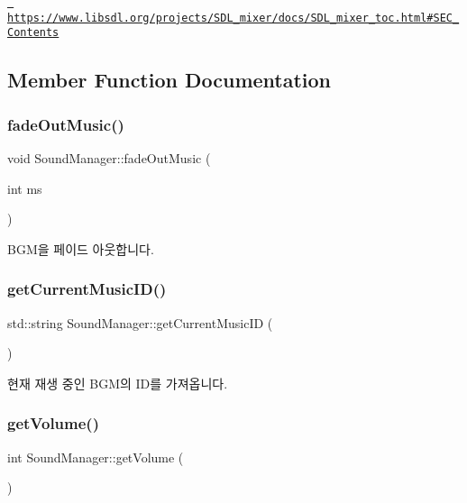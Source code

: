 \href{https://www.libsdl.org/projects/SDL_mixer/docs/SDL_mixer_toc.html\#SEC_Contents}{\texttt{ https\+://www.\+libsdl.\+org/projects/\+S\+D\+L\+\_\+mixer/docs/\+S\+D\+L\+\_\+mixer\+\_\+toc.\+html\#\+S\+E\+C\+\_\+\+Contents}} 

\subsection{Member Function Documentation}
\mbox{\label{class_sound_manager_aea6a94c8b5456812c49115baa7534bf7}} 
\subsubsection{\texorpdfstring{fadeOutMusic()}{fadeOutMusic()}}
{\footnotesize\ttfamily void Sound\+Manager\+::fade\+Out\+Music (\begin{DoxyParamCaption}\item[{int}]{ms }\end{DoxyParamCaption})}

B\+G\+M을 페이드 아웃합니다. \mbox{\label{class_sound_manager_ae9cccb723db77713287462b57caf7c2d}} 
\subsubsection{\texorpdfstring{getCurrentMusicID()}{getCurrentMusicID()}}
{\footnotesize\ttfamily std\+::string Sound\+Manager\+::get\+Current\+Music\+ID (\begin{DoxyParamCaption}{ }\end{DoxyParamCaption})}

현재 재생 중인 B\+G\+M의 I\+D를 가져옵니다. \mbox{\label{class_sound_manager_a013d883ce7fce00a50ffcc18b0336e16}} 
\subsubsection{\texorpdfstring{getVolume()}{getVolume()}}
{\footnotesize\ttfamily int Sound\+Manager\+::get\+Volume (\begin{DoxyParamCaption}{ }\end{DoxyParamCaption})}


